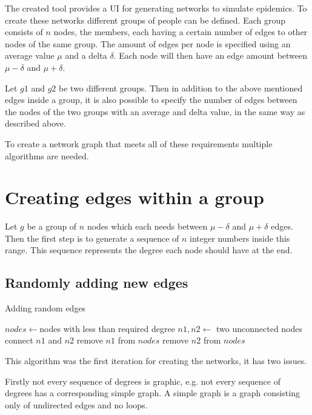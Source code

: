 The created tool provides a UI for generating networks to simulate epidemics. To create these networks different groups of people can be defined. Each group consists of $n$ nodes, the members, each having a certain number of edges to other nodes of the same group. The amount of edges per node is specified using an average value $\mu$ and a delta $\delta$. Each node will then have an edge amount between $\mu - \delta$ and $\mu + \delta$.

Let $g1$ and $g2$ be two different groups. Then in addition to the above mentioned edges inside a group, it is also possible to specify the number of edges between the nodes of the two groups with an average and delta value, in the same way as described above.

To create a network graph that meets all of these requirements multiple algorithms are needed.

\section{Creating edges within a group}
\label{sec:creating_edges_in_group}
Let $g$ be a group of $n$ nodes which each needs between $\mu - \delta$ and $\mu + \delta$ edges. Then the first step is to generate a sequence of $n$ integer numbers inside this range. This sequence represents the degree each node should have at the end.

\subsection{Randomly adding new edges}
\begin{algorithm}
\caption{Adding random edges}
\label{alg:random_edges}
\begin{algorithmic}
\State $nodes \gets $nodes with less than required degree
    \State $n1, n2 \gets$ two unconnected nodes
    \State connect $n1$ and $n2$
        \State remove $n1$ from $nodes$
    \EndIf
        \State remove $n2$ from $nodes$
    \EndIf
\EndWhile
\end{algorithmic}
\end{algorithm}

This algorithm was the first iteration for creating the networks, it has two issues. 
\newline

Firstly not every sequence of degrees is graphic, e.g. not every sequence of degrees has a corresponding simple graph. A simple graph is a graph consisting only of undirected edges and no loops.

